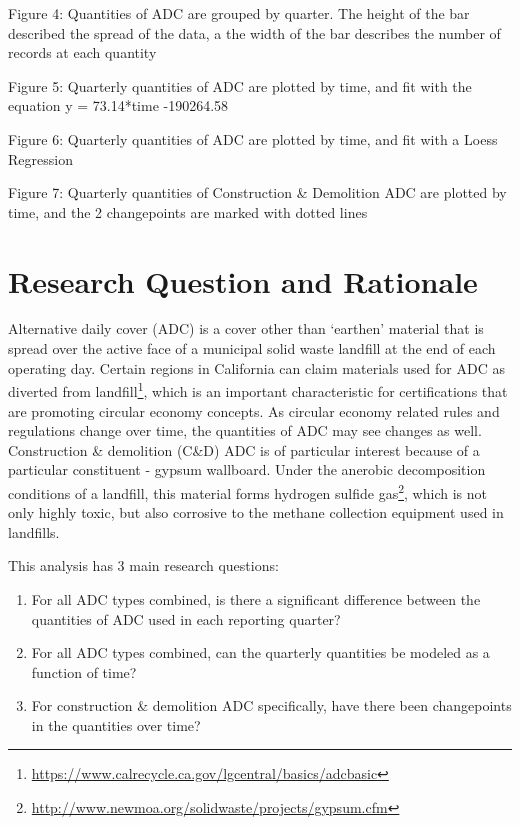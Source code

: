 \documentclass[12pt,]{article}
\let\rmarkdownfootnote\footnote%
\def\footnote{\protect\rmarkdownfootnote}
\begin{document}
Figure 4: Quantities of ADC are grouped by quarter. The height of the
bar described the spread of the data, a the width of the bar describes
the number of records at each quantity

Figure 5: Quarterly quantities of ADC are plotted by time, and fit with
the equation y = 73.14*time -190264.58

Figure 6: Quarterly quantities of ADC are plotted by time, and fit with
a Loess Regression

Figure 7: Quarterly quantities of Construction \& Demolition ADC are
plotted by time, and the 2 changepoints are marked with dotted lines

\newpage

\section{Research Question and
Rationale}\label{research-question-and-rationale}

Alternative daily cover (ADC) is a cover other than `earthen' material
that is spread over the active face of a municipal solid waste landfill
at the end of each operating day. Certain regions in California can
claim materials used for ADC as diverted from landfill\footnote{\url{https://www.calrecycle.ca.gov/lgcentral/basics/adcbasic}},
which is an important characteristic for certifications that are
promoting circular economy concepts. As circular economy related rules
and regulations change over time, the quantities of ADC may see changes
as well. Construction \& demolition (C\&D) ADC is of particular interest
because of a particular constituent - gypsum wallboard. Under the
anerobic decomposition conditions of a landfill, this material forms
hydrogen sulfide gas\footnote{\url{http://www.newmoa.org/solidwaste/projects/gypsum.cfm}},
which is not only highly toxic, but also corrosive to the methane
collection equipment used in landfills.

This analysis has 3 main research questions:

\begin{enumerate}
\def\labelenumi{\arabic{enumi})}
\item
  For all ADC types combined, is there a significant difference between
  the quantities of ADC used in each reporting quarter?
\item
  For all ADC types combined, can the quarterly quantities be modeled as
  a function of time?
\item
  For construction \& demolition ADC specifically, have there been
  changepoints in the quantities over time?
\end{enumerate}
\end{document}
